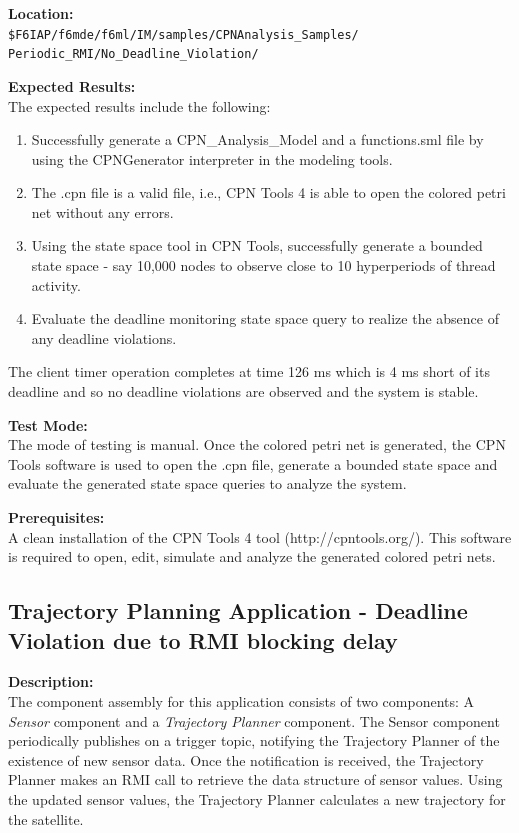 \noindent\textbf{Location:}\\
\texttt{\$F6IAP/f6mde/f6ml/IM/samples/CPNAnalysis\_Samples/ \\ Periodic\_RMI/No\_Deadline\_Violation/}

\noindent\textbf{Expected Results:}\\
The expected results include the following: 
\begin{enumerate}
\item Successfully generate a CPN\_Analysis\_Model and a functions.sml file by using the CPNGenerator interpreter in the modeling tools.
\item The .cpn file is a valid file, i.e., CPN Tools 4 is able to open the colored petri net without any errors.
\item Using the state space tool in CPN Tools, successfully generate a bounded state space - say 10,000 nodes to observe close to 10 hyperperiods of thread activity.
\item Evaluate the deadline monitoring state space query to realize the absence of any deadline violations.
\end{enumerate}
The client timer operation completes at time 126 ms which is 4 ms short of its deadline and so no deadline violations are observed and the system is stable. 

\noindent\textbf{Test Mode:}\\
The mode of testing is manual. Once the colored petri net is generated, the CPN Tools software is used to open the .cpn file, generate a bounded state space and evaluate the generated state space queries to analyze the system.

\noindent\textbf{Prerequisites:}\\
A clean installation of the CPN Tools 4 tool (http://cpntools.org/). This software is required to open, edit, simulate and analyze the generated colored petri nets. 

\subsection{Trajectory Planning Application - Deadline Violation due to RMI blocking delay}
\label{sec:TPA_S1}

\noindent\textbf{Description:}\\
The component assembly for this application consists of two components: A \emph{Sensor} component and a \emph{Trajectory Planner} component. The Sensor component periodically publishes on a trigger topic, notifying the Trajectory Planner of the existence of new sensor data. Once the notification is received, the Trajectory Planner makes an RMI call to retrieve the data structure of sensor values. Using the updated sensor values, the Trajectory Planner calculates a new trajectory for the satellite. 

